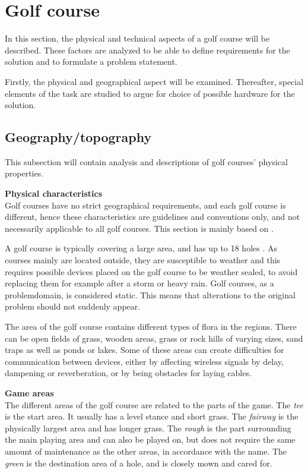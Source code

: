 \section{Golf course}
In this section, the physical and technical aspects of a golf course will be described. These factors are analyzed to be able to define requirements for the solution and to formulate a problem statement.

Firstly, the physical and geographical aspect will be examined. Thereafter, special elements of the task are studied to argue for choice of possible hardware for the solution. 

\subsection{Geography/topography}
This subsection will contain analysis and descriptions of golf courses' physical properties.

\textbf{Physical characteristics}\\
Golf courses have no strict geographical requirements, and each golf course is different, hence these characteristics are guidelines and conventions only, and not necessarily applicable to all golf courses. This section is mainly based on \cite{golfCourse}.

A golf course is typically covering a large area, and has up to 18 holes \cite{golfCourse}. As courses mainly are located outside, they are susceptible to weather and this requires possible devices placed on the golf course to be weather sealed, to avoid replacing them for example after a storm or heavy rain. Golf courses, as a problemdomain, is considered static. This means that alterations to the original problem should not suddenly appear. %

The area of the golf course contains different types of flora in the regions. There can be open fields of grass, wooden areas, grass or rock hills of varying sizes, sand traps as well as ponds or lakes. Some of these areas can create difficulties for communication between devices, either by affecting wireless signals by delay, dampening or reverberation, or by being obstacles for laying cables. 

\textbf{Game areas}\\
The different areas of the golf course are related to the parts of the game. The \textit{tee} is the start area. It usually has a level stance and short grass. The \textit{fairway} is the physically largest area and has longer grass. The \textit{rough} is the part surrounding the main playing area and can also be played on, but does not require the same amount of maintenance as the other areas, in accordance with the name. The \textit{green} is the destination area of a hole, and is closely mown and cared for. 


